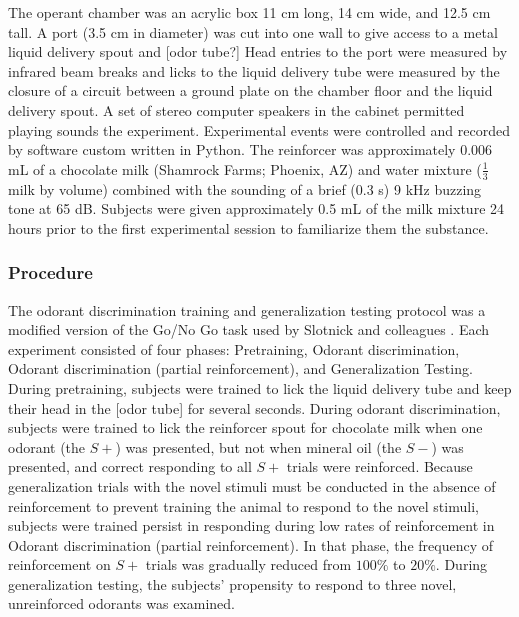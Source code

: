 The operant chamber was an acrylic box 11 cm long, 14 cm wide, and 12.5 cm tall. A port (3.5 cm in diameter) was cut into one wall to give access to a metal liquid delivery spout and [odor tube?] Head entries to the port were measured by infrared beam breaks and licks to the liquid delivery tube were measured by the closure of a circuit between a ground plate on the chamber floor and the liquid delivery spout. A set of stereo computer speakers in the cabinet permitted playing sounds the experiment.  Experimental events were controlled and recorded by software custom written in Python.
The reinforcer was approximately 0.006 mL of a chocolate milk (Shamrock Farms; Phoenix, AZ) and water mixture ($\frac{1}{3}$ milk by volume) combined with the sounding of a brief (0.3 s) 9 kHz buzzing tone at 65 dB. Subjects were given approximately 0.5 mL of the milk mixture 24 hours prior to the first experimental session to familiarize them the substance.  

\subsubsection{Procedure}
The odorant discrimination training and generalization testing protocol was a modified version of the Go/No Go task used by Slotnick and colleagues \cite{18428626}. Each experiment consisted of four phases: Pretraining, Odorant discrimination, Odorant discrimination (partial reinforcement), and Generalization Testing. During pretraining, subjects were trained to lick the liquid delivery tube and keep their head in the [odor tube] for several seconds. During odorant discrimination, subjects were trained to lick the reinforcer spout for chocolate milk when one odorant (the $S+$) was presented, but not when mineral oil (the $S-$) was presented, and correct responding to all $S+$ trials were reinforced. Because generalization trials with the novel stimuli must be conducted in the absence of reinforcement to prevent training the animal to respond to the novel stimuli, subjects were trained persist in responding during low rates of reinforcement in Odorant discrimination (partial reinforcement). In that phase, the frequency of reinforcement on $S+$ trials was gradually reduced from $100\%$ to $20\%$. During generalization testing, the subjects' propensity to respond to three novel, unreinforced odorants was examined.

